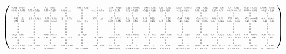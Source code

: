 \documentclass[english,12pt,a4paper,pdftex,sci,utf8]{aaltothesis}
\newcommand\scalemath[2]{\scalebox{#1}{\mbox{\ensuremath{\displaystyle #2}}}}
\begin{document}
\begin{equation}
\label{eq:mido}
\left(
\scalemath{0.28}
{
\begin{array}{cccccccccccccccc}
 0.022+0.59 i & 0 & 0.5-0.32 i & 0 & -0.57+0.61 i & 0 & -0.35+0.016 i & -0.41+0.0056 i & -0.53+0.97 i & 0.29-0.31 i & -0.099-0.0035 i & -0.32-0.64 i & -0.32-0.5 i & 0.5-0.32 i & 0.018+0.69 i & 0.0035-0.099 i \\
 -0.53+0.57 i & 0.59+0.94 i & 0.76+0.17 i & 0.04+1.1 i & 0 & -1.1+0.04 i & 1.1-0.17 i & 0.92-0.19 i & -0.21-0.19 i & 2.2-0.23 i & -1.4+0.49 i & 0.064+1.1 i & 0.17-0.76 i & -0.76-0.17 i & 0.085-0.86 i & -0.49-1.4 i \\
 0 & 0 & 0 & 0 & 0 & 0 & 0 & 0 & 0 & 0 & 0 & 0 & 0 & 0 & 0 & 0 \\
 0 & 0 & 0 & 0 & 0 & 0 & 0 & 0 & 0 & 0 & 0 & 0 & 0 & 0 & 0 & 0 \\
 -0.32-1.1 i & -1.6+0.044 i & -0.76+0.81 i & -1.4-0.75 i & 0 & 0.75-1.4 i & -1.7-0.012 i & 0.24-0.48 i & 0.39-0.12 i & -1.+0.18 i & -0.26-0.31 i & -0.2+0.75 i & 0.81+0.76 i & 0.76-0.81 i & -0.75+0.056 i & 0.31-0.26 i \\
 -0.74-0.4 i & 0 & 0.024+0.84 i & 0 & -0.34-1.1 i & 0 & 0.089+0.97 i & 0.87+0.78 i & 0.46+0.21 i & 0.17+0.57 i & -1.2+0.46 i & -0.4-0.081 i & 0.84-0.024 i & 0.024+0.84 i & -0.28+0.82 i & -0.46-1.2 i \\
 0 & 0 & 0 & 0 & 0 & 0 & 0 & 0 & 0 & 0 & 0 & 0 & 0 & 0 & 0 & 0 \\
 0 & 0 & 0 & 0 & 0 & 0 & 0 & 0 & 0 & 0 & 0 & 0 & 0 & 0 & 0 & 0 \\
 0 & 0 & 0 & 0 & 0 & 0 & 0 & 0 & 0 & 0 & 0 & 0 & 0 & 0 & 0 & 0 \\
 0 & 0 & 0 & 0 & 0 & 0 & 0 & 0 & 0 & 0 & 0 & 0 & 0 & 0 & 0 & 0 \\
 0.72-0.44 i & 0 & 0.024+0.84 i & 0 & 1.2+0.28 i & 0 & -1.1+0.6 i & 0.12+0.076 i & -0.41+0.3 i & -0.58-0.14 i & -0.51-0.29 i & -0.73-0.54 i & 0.84-0.024 i & 0.024+0.84 i & 0.43+0.067 i & 0.29-0.51 i \\
 0.26-1.1 i & 0.044+1.6 i & 0.81+0.76 i & -0.82-1.3 i & 0 & 1.3-0.82 i & -0.79+0.27 i & -0.44+1.1 i & -1.5-0.35 i & 0.91+0.1 i & -0.35-1.1 i & 0.17+1.7 i & 0.76-0.81 i & -0.81-0.76 i & 0.018-0.6 i & 1.1-0.35 i \\
 0 & 0 & 0 & 0 & 0 & 0 & 0 & 0 & 0 & 0 & 0 & 0 & 0 & 0 & 0 & 0 \\
 0 & 0 & 0 & 0 & 0 & 0 & 0 & 0 & 0 & 0 & 0 & 0 & 0 & 0 & 0 & 0 \\
 -0.75+0.23 i & 0.94-0.59 i & 0.17-0.76 i & -0.52+0.98 i & 0 & -0.98-0.52 i & 1.5-0.45 i & 0.62-1.4 i & 0.31+1. i & 1.6-0.42 i & -0.32+1.9 i & -0.038+0.13 i & -0.76-0.17 i & -0.17+0.76 i & -1.7+0.42 i & -1.9-0.32 i \\
 -0.52-0.28 i & 0 & 0.5-0.32 i & 0 & -0.25-0.8 i & 0 & 0.86-0.53 i & -0.58+0.71 i & -0.57-0.95 i & 0.12+0.4 i & -0.81-0.17 i & 0.93+0.73 i & -0.32-0.5 i & 0.5-0.32 i & -0.69+0.53 i & 0.17-0.81 i \\
\end{array}
}
\right)
\end{equation}
\end{document}
